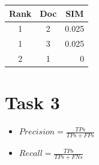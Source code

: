 \documentclass[a4paper]{scrartcl}
\begin{document}
\begin{tabular}{|c|c|r|}
    \hline
    \textbf{Rank} & \textbf{Doc} & \multicolumn{1}{c|}{\textbf{SIM}} \\ \hline
    1             & 2            & 0.025                                   \\ \hline
    1             & 3            & 0.025                             \\ \hline
    2             & 1            & 0                         \\ \hline
\end{tabular}


\pagebreak
\section*{Task 3}

\begin{itemize}
    \item $Precision = \frac{TPs}{TPs+FPs}$
    \item $Recall = \frac{TPs}{TPs+FNs}$
\end{itemize}
\end{document}
